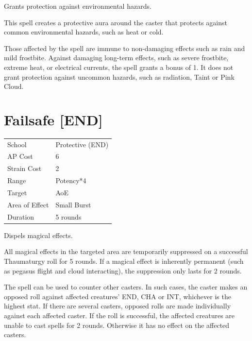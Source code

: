 \documentclass[11pt,a4paper,twocolumn]{book}
\begin{document}
\medskip

Grants protection against environmental hazards.

This spell creates a protective aura around the caster that protects against common environmental hazards, such as heat or cold.

Those affected by the spell are immune to non-damaging effects such as rain and mild frostbite. Against damaging long-term effects, such as severe frostbite, extreme heat, or electrical currents, the spell grants a bonus of 1. It does not grant protection against uncommon hazards, such as radiation, Taint or Pink Cloud.

\vfill


\section*{Failsafe [END]}
{
	\begin{tabu} to 75mm{| X[l,4] | X[l,7] |}
		\hline
		School 			& Protective (END)		\\
        AP Cost	      	& 6 					\\
        Strain Cost     & 2 					\\
        Range     		& Potency*4 			\\
        Target      	& AoE					\\
        Area of Effect  & Small Burst  	 		\\
        Duration     	& 5 rounds 				\\ \hline
	\end{tabu}
		
}

\medskip

Dispels magical effects.

All magical effects in the targeted area are temporarily suppressed on a successful Thaumaturgy roll for 5 rounds. If a magical effect is inherently permanent (such as pegasus flight and cloud interacting), the suppression only lasts for 2 rounds.

The spell can be used to counter other casters. In such cases, the caster makes an opposed roll against affected creatures' END, CHA or INT, whichever is the highest stat. If there are several casters, opposed rolls are made individually against each affected caster. If the roll is successful, the affected creatures are unable to cast spells for 2 rounds. Otherwise it has no effect on the affected casters.
\end{document}
